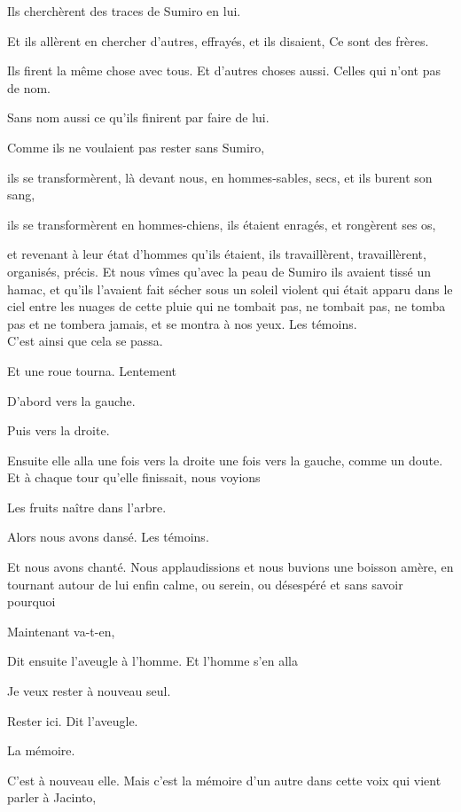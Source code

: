 Ils cherchèrent des traces de Sumiro en lui.

Et ils allèrent en chercher d'autres, effrayés, et ils disaient, Ce sont
des frères.

Ils firent la même chose avec tous. Et d'autres choses aussi. Celles qui
n'ont pas de nom.

Sans nom aussi ce qu'ils finirent par faire de lui.

Comme ils ne voulaient pas rester sans Sumiro,

ils se transformèrent, là devant nous, en hommes-sables, secs, et ils
burent son sang,

ils se transformèrent en hommes-chiens, ils étaient enragés, et
rongèrent ses os,

et revenant à leur état d'hommes qu'ils étaient, ils travaillèrent,
travaillèrent, organisés, précis. Et nous vîmes qu'avec la peau de
Sumiro ils avaient tissé un hamac, et qu'ils l'avaient fait sécher sous
un soleil violent qui était apparu dans le ciel entre les nuages de
cette pluie qui ne tombait pas, ne tombait pas, ne tomba pas et ne
tombera jamais, et se montra à nos yeux. Les témoins.\\

C'est ainsi que cela se passa.

Et une roue tourna. Lentement

D'abord vers la gauche.

Puis vers la droite.

Ensuite elle alla une fois vers la droite une fois vers la gauche, comme
un doute. Et à chaque tour qu'elle finissait, nous voyions

Les fruits naître dans l'arbre.

Alors nous avons dansé. Les témoins.

Et nous avons chanté. Nous applaudissions et nous buvions une boisson
amère, en tournant autour de lui enfin calme, ou serein, ou désespéré et
sans savoir pourquoi

\pagebreak

Maintenant va-t-en,

Dit ensuite l'aveugle à l'homme. Et l'homme s'en alla

Je veux rester à nouveau seul.

Rester ici. Dit l'aveugle.

\pagebreak

La mémoire.

C'est à nouveau elle. Mais c'est la mémoire d'un autre dans cette voix
qui vient parler à Jacinto,\\

